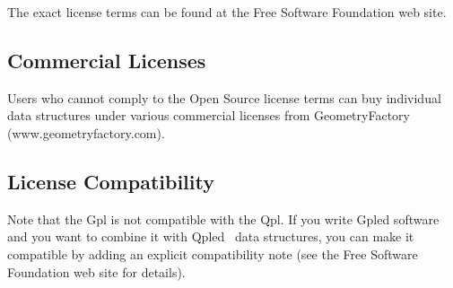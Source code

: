 The exact license terms can be found at the Free Software Foundation web site.

\subsection{Commercial Licenses \label{licenses:Commercial}}

Users who cannot comply to the Open Source license terms can buy individual
data structures under various commercial licenses from GeometryFactory
(www.geometryfactory.com).


\subsection{License Compatibility \label{licenses:Compatibility}}

Note that the {\sc Gpl} is not compatible with the {\sc Qpl}. If you write
{\sc Gpl}ed software and you want to combine it with {\sc Qpl}ed \cgal\ data
structures, you can make it compatible by adding an explicit compatibility
note (see the Free Software Foundation web site for details).
